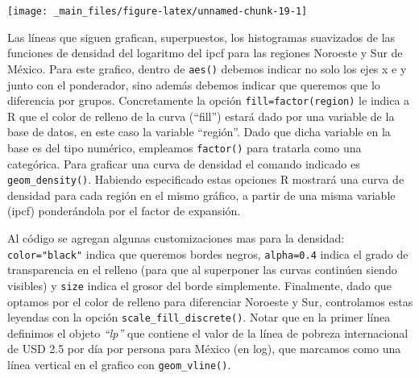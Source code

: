 \documentclass[
]{book}
\begin{document}
\texttt{[image: \_main\_files/figure-latex/unnamed-chunk-19-1]}

Las líneas que siguen grafican, superpuestos, los histogramas suavizados de las funciones de densidad del logaritmo del ipcf para las regiones Noroeste y Sur de México. Para este grafico, dentro de \texttt{aes()} debemos indicar no solo los ejes x e y junto con el ponderador, sino además debemos indicar que queremos que lo diferencia por grupos. Concretamente la opción \texttt{fill=factor(region)} le indica a R que el color de relleno de la curva (``fill'') estará dado por una variable de la base de datos, en este caso la variable ``región''. Dado que dicha variable en la base es del tipo numérico, empleamos \texttt{factor()} para tratarla como una categórica. Para graficar una curva de densidad el comando indicado es \texttt{geom\_density()}. Habiendo especificado estas opciones R mostrará una curva de densidad para cada región en el mismo gráfico, a partir de una misma variable (ipcf) ponderándola por el factor de expansión.

Al código se agregan algunas customizaciones mas para la densidad: \texttt{color="black"} indica que queremos bordes negros, \texttt{alpha=0.4} indica el grado de transparencia en el relleno (para que al superponer las curvas continúen siendo visibles) y \texttt{size} indica el grosor del borde simplemente. Finalmente, dado que optamos por el color de relleno para diferenciar Noroeste y Sur, controlamos estas leyendas con la opción \texttt{scale\_fill\_discrete()}. Notar que en la primer línea definimos el objeto \emph{``lp''} que contiene el valor de la línea de pobreza internacional de USD 2.5 por día por persona para México (en log), que marcamos como una línea vertical en el grafico con \texttt{geom\_vline()}.
\end{document}
